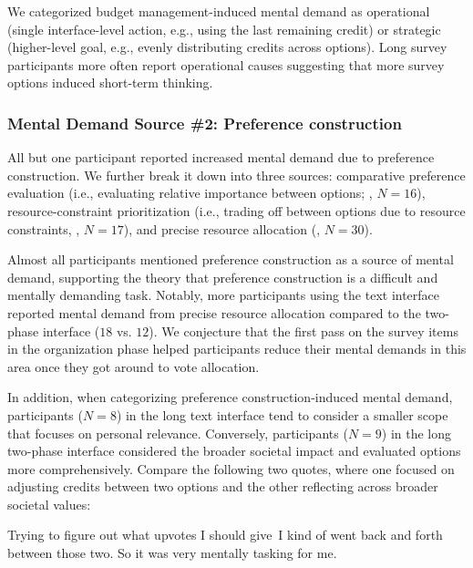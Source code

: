 We categorized budget management-induced mental demand as operational (single interface-level action, e.g., using the last remaining credit) or strategic (higher-level goal, e.g., evenly distributing credits across options). Long survey participants more often report operational causes suggesting that more survey options induced short-term thinking.

\subsubsection{Mental Demand Source \#2: Preference construction}
All but one participant reported increased mental demand due to preference construction. We further break it down into three sources: comparative preference evaluation (i.e., evaluating relative importance between options; , $N=16$), resource-constraint prioritization (i.e., trading off between options due to resource constraints, , $N=17$), and precise resource allocation (, $N=30$).

Almost all participants mentioned preference construction as a source of mental demand, supporting the theory that preference construction is a difficult and mentally demanding task. Notably, more participants using the text interface reported mental demand from precise resource allocation compared to the two-phase interface ($18$ vs. $12$). We conjecture that the first pass on the survey items in the organization phase helped participants reduce their mental demands in this area once they got around to vote allocation.

In addition, when categorizing preference construction-induced mental demand, participants ($N=8$) in the long text interface tend to consider a smaller scope that focuses on personal relevance. Conversely, participants ($N=9$) in the long two-phase interface considered the broader societal impact and evaluated options more comprehensively. Compare the following two quotes, where one focused on adjusting credits between two options and the other reflecting across broader societal values:

\begin{displayquote}
Trying to figure out what upvotes I should give~\bracketellipsis I kind of went back and forth between those two. \bracketellipsis So it was very mentally tasking for me. \hfill{}
\end{displayquote}

